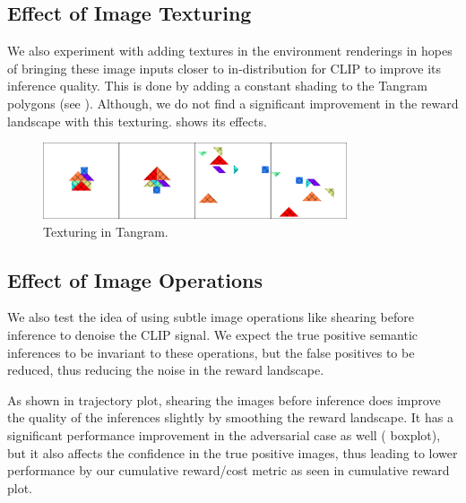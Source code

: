 
\subsection{Effect of Image Texturing}
\label{sec:image-texturing}
We also experiment with adding textures in the environment renderings
in hopes of bringing these image inputs closer to in-distribution for CLIP to improve its inference quality.
This is done by adding a constant shading to the Tangram polygons (see ).
Although, we do not find a significant improvement in the reward landscape with this texturing.
 shows its effects.

\begin{figure}[H]
    \centering
    \includegraphics[width=0.8\textwidth]{images/hatched.pdf}
    \caption{Texturing in Tangram.}
    \label{fig:texturing}
\end{figure}

\subsection{Effect of Image Operations}
\label{sec:image-operations}
We also test the idea of using subtle image operations like shearing before inference to denoise the CLIP signal.
We expect the true positive semantic inferences to be invariant to these operations, but the false positives to be reduced, thus reducing the noise in the reward landscape.

As shown in  trajectory plot, shearing the images before inference does improve the quality of the inferences slightly by smoothing the reward landscape.
It has a significant performance improvement in the adversarial case as well ( boxplot), but it also affects the confidence in the true positive images, thus leading to lower performance by our cumulative reward/cost metric as seen in  cumulative reward plot.


